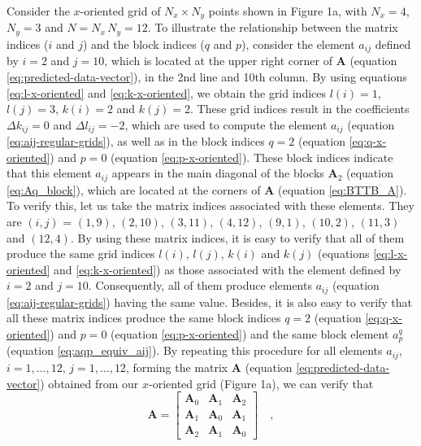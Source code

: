 \documentclass[manuscript,revised]{geophysics}
\begin{document}
Consider the $x$-oriented grid of $N_{x} \times N_{y}$ points shown in Figure 1a, 
with $N_{x} = 4$, $N_{y} = 3$ and $N = N_{x} \, N_{y} = 12$.
To illustrate the relationship between the matrix indices ($i$ and $j$) and 
the block indices ($q$ and $p$), consider the element $a_{ij}$ defined by 
$i = 2$ and $j = 10$, which is
located at the upper right corner of $\mathbf{A}$ (equation \ref{eq:predicted-data-vector}), 
in the 2nd line and 10th column.
By using equations \ref{eq:l-x-oriented} and \ref{eq:k-x-oriented}, we obtain the 
grid indices $l(i) = 1$, $l(j) = 3$, $k(i) = 2$ and $k(j) = 2$.
These grid indices result in the coefficients $\Delta k_{ij} = 0$ and $\Delta l_{ij} = -2$,
which are used to compute the element $a_{ij}$ (equation \ref{eq:aij-regular-grids}),
as well as in the block indices $q = 2$ (equation \ref{eq:q-x-oriented}) and 
$p = 0$ (equation \ref{eq:p-x-oriented}).
These block indices indicate that this element $a_{ij}$ appears in the main diagonal
of the blocks $\mathbf{A}_{2}$ (equation \ref{eq:Aq_block}), which are located at the corners 
of $\mathbf{A}$ (equation \ref{eq:BTTB_A}).
To verify this, let us take the matrix indices associated with these elements.
They are $(i, j)$ = $(1, 9)$, $(2, 10)$, $(3, 11)$, $(4, 12)$, $(9, 1)$, $(10, 2)$, 
$(11, 3)$ and $(12, 4)$. By using these matrix indices, it is easy to verify that all
of them produce the same grid indices $l(i)$, $l(j)$, $k(i)$ and $k(j)$ 
(equations \ref{eq:l-x-oriented} and \ref{eq:k-x-oriented}) as those associated with
the element defined by $i = 2$ and $j = 10$. Consequently, all of them produce
elements $a_{ij}$ (equation \ref{eq:aij-regular-grids}) having the same value.
Besides, it is also easy to verify that all these matrix indices produce the same block
indices $q = 2$ (equation \ref{eq:q-x-oriented}) and $p = 0$ (equation \ref{eq:p-x-oriented})
and the same block element $a^{q}_{p}$ (equation \ref{eq:aqp_equiv_aij}).
By repeating this procedure for all elements $a_{ij}$, $i = 1, \dots, 12$, $j = 1, \dots, 12$, 
forming the matrix $\mathbf{A}$ (equation \ref{eq:predicted-data-vector}) obtained from our 
$x$-oriented grid (Figure 1a), we can verify that
\begin{equation}
\mathbf{A} = \begin{bmatrix}
\mathbf{A}_{0} & \mathbf{A}_{1} & \mathbf{A}_{2} \\
\mathbf{A}_{1} & \mathbf{A}_{0} & \mathbf{A}_{1} \\
\mathbf{A}_{2} & \mathbf{A}_{1} & \mathbf{A}_{0}
\end{bmatrix} \quad ,
\label{eq:A-x-oriented-example}
\end{equation}
\end{document}
